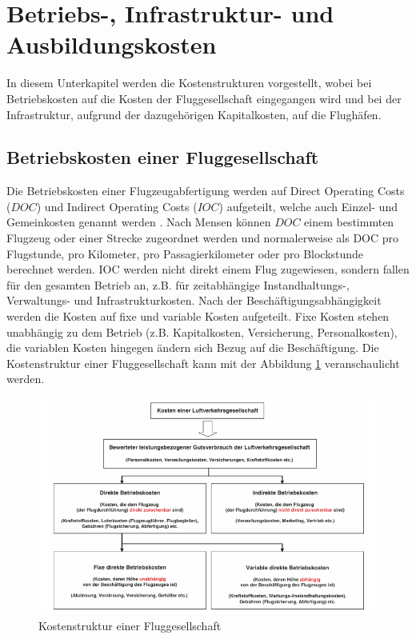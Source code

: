 \section{Betriebs-, Infrastruktur- und Ausbildungskosten}
\label{s:Kosten}
In diesem Unterkapitel werden die Kostenstrukturen vorgestellt, 
wobei bei Betriebskosten auf die Kosten der Fluggesellschaft
eingegangen wird und bei der Infrastruktur, aufgrund der dazugehörigen Kapitalkosten, auf die Flughäfen.
%
\subsection{Betriebskosten einer Fluggesellschaft}
%
Die Betriebskosten einer Flugzeugabfertigung werden auf Direct Operating Costs ($DOC$) und Indirect Operating Costs 
($IOC$) aufgeteilt, welche auch Einzel- und\\ Gemeinkosten genannt werden \cite{conrady2019luftverkehr}. 
Nach Mensen \cite{mensen2013handbuch} können $DOC$ einem bestimmten Flugzeug oder einer Strecke zugeordnet 
werden und normalerweise als DOC pro Flugstunde, pro Kilometer, pro Passagierkilometer oder pro Blockstunde 
berechnet werden. IOC werden nicht direkt einem Flug zugewiesen, sondern fallen für den gesamten Betrieb an, 
z.B. für zeitabhängige Instandhaltungs-, Verwaltungs- und Infrastrukturkosten. 
Nach der Beschäftigungsabhängigkeit werden die Kosten auf fixe und variable Kosten aufgeteilt. 
Fixe Kosten stehen unabhängig zu dem Betrieb (z.B. Kapitalkosten, Versicherung, Personalkosten), 
die variablen Kosten hingegen ändern sich Bezug auf die Beschäftigung.
%
Die Kostenstruktur einer Fluggesellschaft kann mit der Abbildung \ref{doc} veranschaulicht werden.
%
\begin{figure}[h]
	\centering
	\includegraphics[width=0.9\linewidth]{Bilder/Systematik der DOC_Berechnung.png}
	\caption[Kostenstruktur einer Fluggesellschaft]{Kostenstruktur einer Fluggesellschaft \cite{mensen2013handbuch}}
	\label{doc}
\end{figure}
